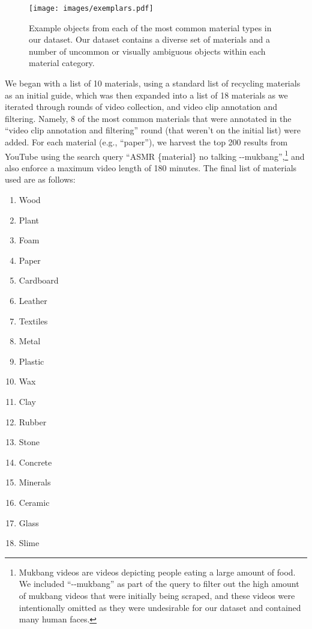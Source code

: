 \documentclass[runningheads]{llncs}
\begin{document}
\begin{figure}
    \centering
    \texttt{[image: images/exemplars.pdf]}
    \caption{Example objects from each of the most common material types in our dataset. Our dataset contains a diverse set of materials and a number of uncommon or visually ambiguous objects within each material category.}
    \label{fig:exemplars}
\end{figure}

We began with a list of 10 materials, using a standard list of recycling materials~\cite{materiallist} as an initial guide, which was then expanded into a list of 18 materials as we iterated through rounds of video collection, and video clip annotation and filtering. Namely, 8 of the most common materials that were annotated in the ``video clip annotation and filtering'' round (that weren't on the initial list) were added. For each material (e.g., ``paper''), we harvest the top 200 results from YouTube using the search query ``ASMR \{material\} no talking -{}-mukbang'',\footnote{Mukbang videos are videos depicting people eating a large amount of food. We included ``-{}-mukbang'' as part of the query to filter out the high amount of mukbang videos that were initially being scraped, and these videos were intentionally omitted as they were undesirable for our dataset and contained many human faces.} and also enforce a maximum video length of 180 minutes. The final list of materials used are as follows:
\begin{multicols}{3}
\centering
\begin{enumerate}
    \item Wood
    \item Plant
    \item Foam
    \item Paper
    \item Cardboard
    \item Leather
    \item Textiles
    \item Metal
    \item Plastic
    \item Wax
    \item Clay
    \item Rubber
    \item Stone
    \item Concrete
    \item Minerals
    \item Ceramic
    \item Glass
    \item Slime
\end{enumerate}
\end{multicols}
\end{document}
